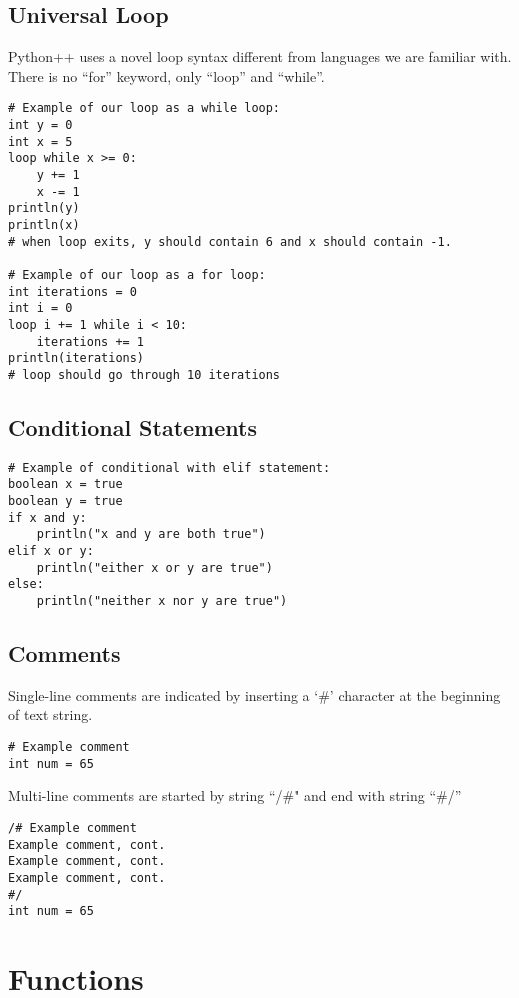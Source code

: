 \documentclass{article}
\begin{document}
\subsection{Universal Loop}
Python++ uses a novel loop syntax different from languages we are familiar with. There is no ``for'' keyword, only ``loop'' and ``while''.

\begin{verbatim}
# Example of our loop as a while loop:
int y = 0
int x = 5
loop while x >= 0:
    y += 1
    x -= 1
println(y)
println(x)
# when loop exits, y should contain 6 and x should contain -1.

# Example of our loop as a for loop:
int iterations = 0
int i = 0
loop i += 1 while i < 10:
    iterations += 1
println(iterations)
# loop should go through 10 iterations

\end{verbatim}


\subsection{Conditional Statements}

\begin{verbatim}
# Example of conditional with elif statement:
boolean x = true
boolean y = true
if x and y:
    println("x and y are both true")
elif x or y:
    println("either x or y are true")
else:
    println("neither x nor y are true")
\end{verbatim}

\subsection{Comments}

Single-line comments are indicated by inserting a `\#' character at the beginning of text string.

\begin{verbatim}
# Example comment
int num = 65
\end{verbatim}

\noindent Multi-line comments are started by string ``/\#" and end with string ``\#/''
\begin{verbatim}
/# Example comment
Example comment, cont.
Example comment, cont.
Example comment, cont.
#/
int num = 65
\end{verbatim}

\section{Functions}
\end{document}

